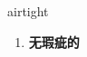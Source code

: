 
\begin{frame}
{\huge airtight}
\begin{center}
\begin{enumerate}\Large
  \item \textbf{无瑕疵的}
\end{enumerate}
\end{center}
\end{frame}
